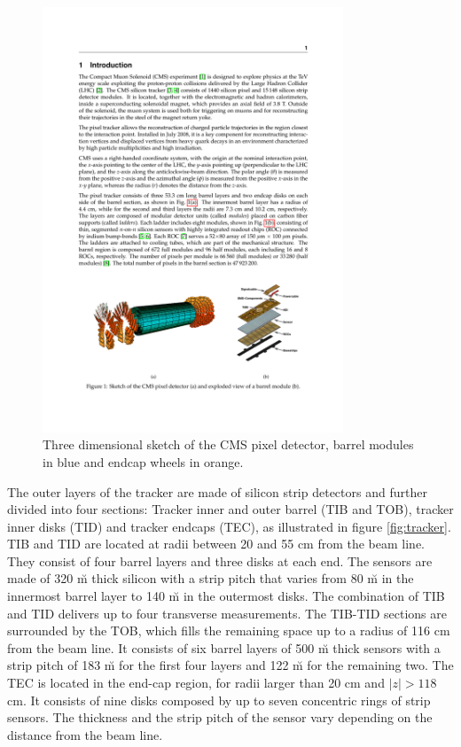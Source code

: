 \begin{figure}
\begin{center}
\includegraphics[angle=-0,width=0.8\textwidth]{2_LHC_and_CMS/pics/pixelfull.pdf}
\caption{Three dimensional sketch of the CMS pixel detector, barrel modules in blue and endcap wheels in orange.
\label{fig:pixel}
}
\end{center}
\end{figure}

The outer layers of the tracker are made of silicon strip detectors and further divided into four sections: Tracker inner and outer barrel (TIB and TOB), tracker inner disks (TID) and tracker endcaps (TEC), as illustrated in figure \ref{fig:tracker}. TIB and TID are located at radii between 20 and 55 cm from the beam line. They consist of four barrel layers and three disks at each end. The sensors are made of 320 \u m thick silicon with a strip pitch that varies from 80 \u m in the innermost barrel layer to 140 \u m in the outermost disks. The combination of TIB and TID delivers up to four transverse measurements. The TIB-TID sections are surrounded by the TOB, which fills the remaining space up to a radius of 116 cm from the beam line. It consists of six barrel layers of 500 \u m thick sensors with a strip pitch of 183 \u m for the first four layers and 122 \u m for the remaining two. The TEC is located in the end-cap region, for radii larger than 20 cm and $|z| > 118$ cm. It consists of nine disks composed by up to seven concentric rings of strip sensors. The thickness and the strip pitch of the sensor vary depending on the distance from the beam line. 

